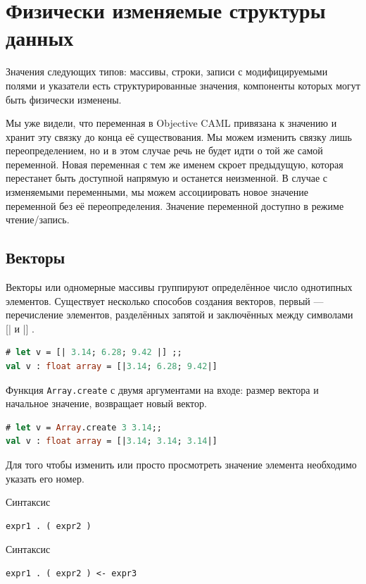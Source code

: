 \section{Физически изменяемые структуры данных}

Значения следующих типов: массивы, строки, записи с модифицируемыми полями и
указатели есть структурированные значения, компоненты которых могут быть
физически изменены.

Мы уже видели, что переменная в Objective CAML привязана к значению и хранит эту
связку до конца её существования. Мы можем изменить связку лишь
переопределением, но и в этом случае речь не будет идти о той же самой
переменной. Новая переменная с тем же именем скроет предыдущую, которая
перестанет быть доступной напрямую и останется неизменной. В случае с
изменяемыми переменными, мы можем ассоциировать новое значение переменной без её
переопределения. Значение переменной доступно в режиме чтение/запись.

\subsection{Векторы}

Векторы или одномерные массивы группируют определённое число однотипных
элементов. Существует несколько способов создания векторов, первый —
перечисление элементов, разделённых запятой и заключённых между символами [| и
|] .

\begin{lstlisting}[language=OCaml]
# let v = [| 3.14; 6.28; 9.42 |] ;;
val v : float array = [|3.14; 6.28; 9.42|]
\end{lstlisting}

Функция \texttt{Array.create} с двумя аргументами на входе: размер вектора и
начальное значение, возвращает новый вектор.

\begin{lstlisting}[language=OCaml]
# let v = Array.create 3 3.14;;
val v : float array = [|3.14; 3.14; 3.14|]
\end{lstlisting}

Для того чтобы изменить или просто просмотреть значение элемента необходимо
указать его номер.

Синтаксис

\begin{lstlisting}[language=OCaml]
expr1 . ( expr2 )
\end{lstlisting}

Синтаксис

\begin{lstlisting}[language=OCaml]
expr1 . ( expr2 ) <- expr3
\end{lstlisting}

